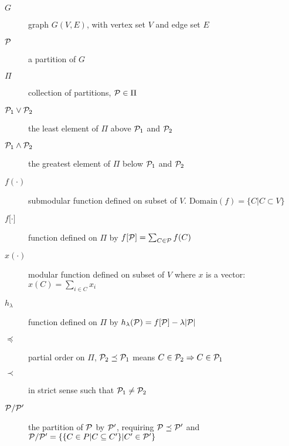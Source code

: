 \begin{description}
\item[$G$] graph $G(V,E)$, with vertex set $V$ and edge set $E$
\item[$\P$] a partition of $G$
\item[$\Pi$] collection of partitions, $\P \in \Pi$
\item[$\P_1 \vee \P_2$] the least element of $\Pi$ above $\P_1$ and $\P_2$
\item[$\P_1 \wedge \P_2$] the greatest element of $\Pi$ below $\P_1$ and $\P_2$
\item[$f(\cdot)$] submodular function defined on subset of $V$. $\mathrm{Domain}(f)=\{C| C\subset V\}$
\item[$f{[}\cdot{]}$] function defined on $\Pi$ by $f[\P] = \sum_{C\in \P} f(C)$
\item[$x(\cdot)$] modular function defined on subset of $V$ where $x$ is a vector: $x(C)=\sum_{i \in C} x_i$
\item[$h_{\lambda}$] function defined on $\Pi$ by $h_{\lambda}(\P)=f[\P]-\lambda\abs{\P}$
\item[$\preceq$] partial order on $\Pi$, $\P_2 \preceq \P_1$ means $C\in \P_2 \Rightarrow C \in \P_1$
\item[$\prec$] in strict sense such that $\P_1 \neq \P_2 $
\item[$\P/\P'$] the partition of $\P$ by $\P'$, requiring $\P\preceq \P'$ and $\P/\P'=\{\{ C \in P | C \subseteq C' \} | C' \in \P'\}$
\end{description}

